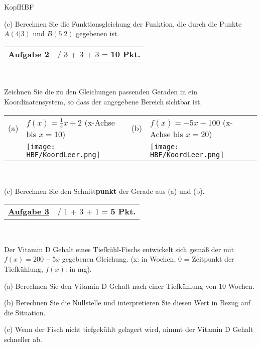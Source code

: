 \documentclass[oneside,openany,headings=optiontotoc,11pt,numbers=noenddot]{scrreprt}
\begin{document}
\begin{test}{0.725}{KopfHBF}
\begin{framed}
			(c) Berechnen Sie die Funktionsgleichung der Funktion, die durch die Punkte \(A(4|3)\) und \(B(5|2)\) gegebenen ist.
		\end{framed}
		\begin{framed}
			\noindent
			\begin{tabularx}{\textwidth}{Xl}\underline{\textbf{Aufgabe 2}}& / 3 + 3 + 3 = \textbf{10 Pkt.}\end{tabularx}\\
			\par\noindent
			Zeichnen Sie die zu den Gleichungen passenden Geraden in ein Koordinatensystem, so dass der angegebene Bereich sichtbar ist.\\
			\par\noindent
			\begin{tabularx}{\textwidth}{lXlX}
				(a) &\(f(x) = \frac{1}{4}x +2\) (x-Achse bis \(x=10\)) & (b) & \(f(x) = -5x + 100\) (x-Achse bis \(x = 20\))\\ & \texttt{[image: HBF/KoordLeer.png]} & & \texttt{[image: HBF/KoordLeer.png]}
			\end{tabularx}\\
			\par\noindent
			(c) Berechnen Sie den Schnitt\textbf{punkt} der Gerade aus (a) und (b).\\
		\end{framed}
		\begin{framed}
			\noindent
			\begin{tabularx}{\textwidth}{Xl}\underline{\textbf{Aufgabe 3}}& / 1 + 3 + 1 = \textbf{5 Pkt.}\end{tabularx}\\
			\par\noindent
			Der Vitamin D Gehalt eines Tiefkühl-Fischs entwickelt sich gemäß der mit \(f(x) = 200 -5x\) gegebenen Gleichung. (x: in Wochen, 0 = Zeitpunkt der Tiefkühlung, \(f(x)\): in mg).\\
			\par\noindent
			(a) Berechnen Sie den Vitamin D Gehalt nach einer Tiefkühlung von 10 Wochen.\\
			\par\noindent
			(b) Berechnen Sie die Nullstelle und interpretieren Sie diesen Wert in Bezug auf die Situation.\\
			\par\noindent
			(c) Wenn der Fisch nicht tiefgekühlt gelagert wird, nimmt der Vitamin D Gehalt schneller ab.\\

\end{framed}
\end{test}
\end{document}
